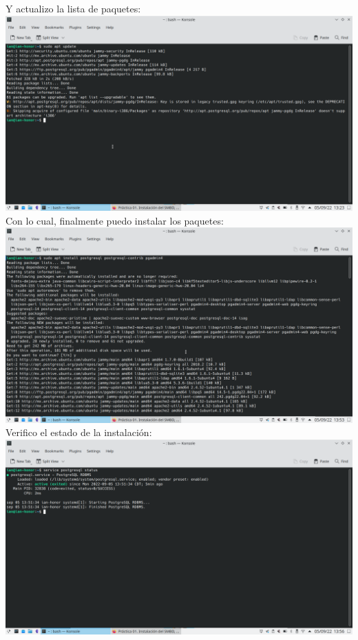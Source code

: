 \documentclass[12pt,a4paper]{article}
\begin{document}
\begin{enumerate}
        Y actualizo la lista de paquetes:\\
        \includegraphics[scale=0.3]{assets/ian_5.png}\\
        
        Con lo cual, finalmente puedo instalar los paquetes:\\
        \includegraphics[scale=0.3]{assets/ian_6.png}\\

        Verifico el estado de la instalación:\\
        \includegraphics[scale=0.3]{assets/ian_7.png}\\
        

\end{enumerate}
\end{document}
